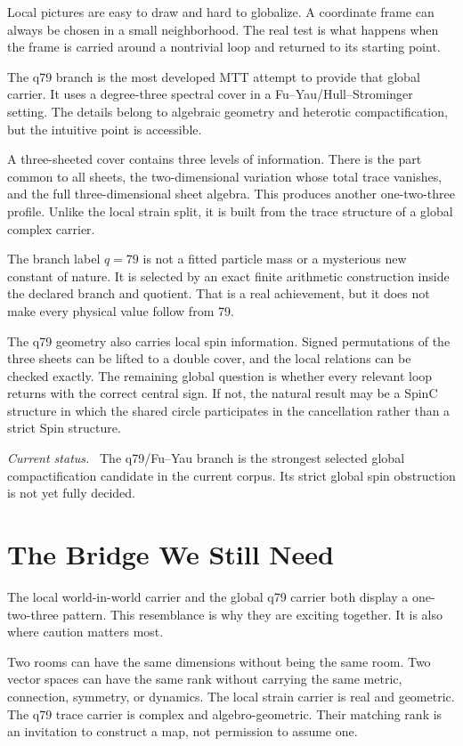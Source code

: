 \documentclass[11pt,openany]{book}
\newenvironment{statusnote}
  {\par\small\noindent\textit{Current status.}\ }
  {\par}
\begin{document}
Local pictures are easy to draw and hard to globalize. A coordinate frame can
always be chosen in a small neighborhood. The real test is what happens when
the frame is carried around a nontrivial loop and returned to its starting
point.

The q79 branch is the most developed MTT attempt to provide that global
carrier. It uses a degree-three spectral cover in a Fu--Yau/Hull--Strominger
setting. The details belong to algebraic geometry and heterotic
compactification, but the intuitive point is accessible.

A three-sheeted cover contains three levels of information. There is the part
common to all sheets, the two-dimensional variation whose total trace
vanishes, and the full three-dimensional sheet algebra. This produces another
one-two-three profile. Unlike the local strain split, it is built from the
trace structure of a global complex carrier.

The branch label $q=79$ is not a fitted particle mass or a mysterious new
constant of nature. It is selected by an exact finite arithmetic construction
inside the declared branch and quotient. That is a real achievement, but it
does not make every physical value follow from 79.

The q79 geometry also carries local spin information. Signed permutations of
the three sheets can be lifted to a double cover, and the local relations can
be checked exactly. The remaining global question is whether every relevant
loop returns with the correct central sign. If not, the natural result may be
a SpinC structure in which the shared circle participates in the
cancellation rather than a strict Spin structure.

\begin{statusnote}
The q79/Fu--Yau branch is the strongest selected global compactification
candidate in the current corpus. Its strict global spin obstruction is not
yet fully decided.
\end{statusnote}

\chapter{The Bridge We Still Need}

The local world-in-world carrier and the global q79 carrier both display a
one-two-three pattern. This resemblance is why they are exciting together.
It is also where caution matters most.

Two rooms can have the same dimensions without being the same room. Two
vector spaces can have the same rank without carrying the same metric,
connection, symmetry, or dynamics. The local strain carrier is real and
geometric. The q79 trace carrier is complex and algebro-geometric. Their
matching rank is an invitation to construct a map, not permission to assume
one.
\end{document}
